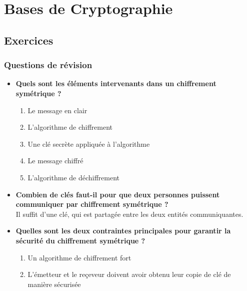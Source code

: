 \documentclass{report}
\begin{document}

\chapter{Bases de Cryptographie}
	
	\section{Exercices}

		\subsection{Questions de révision}

			\begin{itemize}
				\item \textbf{Quels sont les éléments intervenants dans un chiffrement symétrique ?} \\

					\begin{enumerate}
						\item Le message en clair
						\item L'algorithme de chiffrement
						\item Une clé secrète appliquée à l'algorithme
						\item Le message chiffré
						\item L'algorithme de déchiffrement
					\end{enumerate}

				\item \textbf{Combien de clés faut-il pour que deux personnes puissent communiquer par chiffrement symétrique ?}\\

					Il suffit d'une clé, qui est partagée entre les deux entités communiquantes.\\

				\item \textbf{Quelles sont les deux contraintes principales pour garantir la sécurité du chiffrement symétrique ?}\\

					\begin{enumerate}
						\item Un algorithme de chiffrement fort
						\item L'émetteur et le reçeveur doivent avoir obtenu leur copie de clé de manière sécurisée\\
					\end{enumerate}


\end{itemize}
\end{document}
